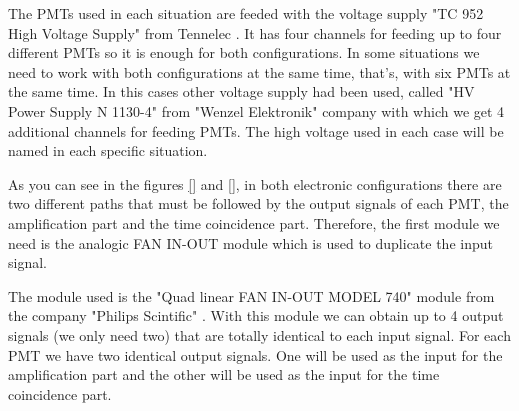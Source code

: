 The PMTs used in each situation are feeded with the voltage supply "TC 952 High Voltage Supply" from Tennelec \cite{DataSheetHVSupplyTennelec}. It has four channels for feeding up to four different PMTs so it is enough for both configurations. In some situations we need to work with both configurations at the same time, that's, with six PMTs at the same time.  In this cases other voltage supply had been used, called  "HV Power Supply N 1130-4" from "Wenzel Elektronik" \cite{DataSheetHVSupplyWenzel} company with which we get 4 additional channels for feeding PMTs. The high voltage used in each case will be named in each specific situation.

As you can see in the figures \ref{} and \ref{}, in both electronic configurations there are two different paths that must be followed by the output signals of each PMT, the amplification part and the time coincidence part. Therefore, the first module we need is the analogic FAN IN-OUT module which is used to duplicate the input signal.

The module used is the "Quad linear FAN IN-OUT MODEL 740" module from the company "Philips Scintific" \cite{DataSheetFANINOUT}. With this module we can obtain up to 4 output signals (we only need two) that are totally identical to each input signal. For each PMT we have two identical output signals. One will be used as the input for the amplification part and the other will be used as the input for the time coincidence part.

